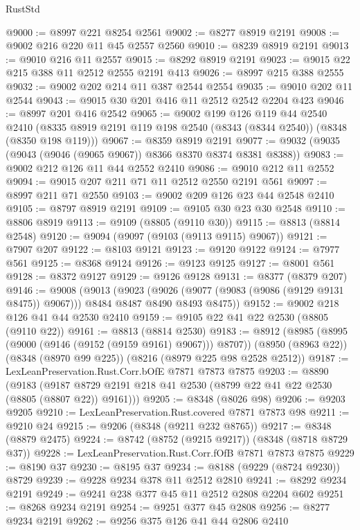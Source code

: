 \begin{lexlean}{RustStd}
\begin{coremodule}
@9000 := @8997 @221 @8254 @2561
@9002 := @8277 @8919 @2191
@9008 := @9002 @216 @220 @11 @45 @2557 @2560
@9010 := @8239 @8919 @2191
@9013 := @9010 @216 @11 @2557
@9015 := @8292 @8919 @2191
@9023 := @9015 @22 @215 @388 @11 @2512 @2555 @2191 @413
@9026 := @8997 @215 @388 @2555
@9032 := @9002 @202 @214 @11 @387 @2544 @2554
@9035 := @9010 @202 @11 @2544
@9043 := @9015 @30 @201 @416 @11 @2512 @2542 @2204 @423
@9046 := @8997 @201 @416 @2542
@9065 := @9002
    @199
    @126
    @119
    @44
    @2540
    @2410
    (@8335 @8919 @2191 @119 @198 @2540 (@8343 (@8344 @2540)) (@8348 (@8350 @198 @119)))
@9067 := @8359 @8919 @2191
@9077 := @9032 (@9035 (@9043 (@9046 (@9065 @9067)) @8366 @8370 @8374 @8381 @8388))
@9083 := @9002 @212 @126 @11 @44 @2552 @2410
@9086 := @9010 @212 @11 @2552
@9094 := @9015 @207 @211 @71 @11 @2512 @2550 @2191 @561
@9097 := @8997 @211 @71 @2550
@9103 := @9002 @209 @126 @23 @44 @2548 @2410
@9105 := @8797 @8919 @2191
@9109 := @9105 @30 @23 @30 @2548
@9110 := @8806 @8919
@9113 := @9109 (@8805 (@9110 @30))
@9115 := @8813 (@8814 @2548)
@9120 := @9094 (@9097 (@9103 (@9113 @9115) @9067))
@9121 := @7907 @207
@9122 := @8103 @9121
@9123 := @9120 @9122
@9124 := @7977 @561
@9125 := @8368 @9124
@9126 := @9123 @9125
@9127 := @8001 @561
@9128 := @8372 @9127
@9129 := @9126 @9128
@9131 := @8377 (@8379 @207)
@9146 := @9008
    (@9013
      (@9023
        (@9026 (@9077 (@9083 (@9086 (@9129 @9131 @8475)) @9067)))
        @8484
        @8487
        @8490
        @8493
        @8475))
@9152 := @9002 @218 @126 @41 @44 @2530 @2410
@9159 := @9105 @22 @41 @22 @2530 (@8805 (@9110 @22))
@9161 := @8813 (@8814 @2530)
@9183 := @8912
    (@8985 (@8995 (@9000 (@9146 (@9152 (@9159 @9161) @9067))) @8707))
    (@8950 (@8963 @22))
    (@8348 (@8970 @99 @225))
    (@8216 (@8979 @225 @98 @2528 @2512))
@9187 := LexLeanPreservation.Rust.Corr.bOfE @7871 @7873 @7875
@9203 := @8890
    (@9183 (@9187 @8729 @2191 @218 @41 @2530 (@8799 @22 @41 @22 @2530 (@8805 (@8807 @22)) @9161)))
@9205 := @8348 (@8026 @98)
@9206 := @9203 @9205
@9210 := LexLeanPreservation.Rust.covered @7871 @7873 @98
@9211 := @9210 @24
@9215 := @9206 (@8348 (@9211 @232 @8765))
@9217 := @8348 (@8879 @2475)
@9224 := @8742 (@8752 (@9215 @9217)) (@8348 (@8718 @8729 @37))
@9228 := LexLeanPreservation.Rust.Corr.fOfB @7871 @7873 @7875
@9229 := @8190 @37
@9230 := @8195 @37
@9234 := @8188 (@9229 (@8724 @9230)) @8729
@9239 := @9228 @9234 @378 @11 @2512 @2810
@9241 := @8292 @9234 @2191
@9249 := @9241 @238 @377 @45 @11 @2512 @2808 @2204 @602
@9251 := @8268 @9234 @2191
@9254 := @9251 @377 @45 @2808
@9256 := @8277 @9234 @2191
@9262 := @9256 @375 @126 @41 @44 @2806 @2410

\end{coremodule}
\end{lexlean}
